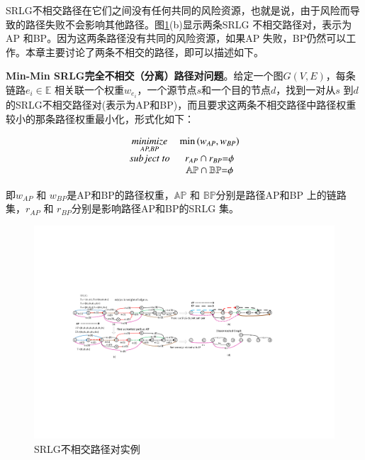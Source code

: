 SRLG不相交路径在它们之间没有任何共同的风险资源，也就是说，由于风险而导致的路径失败不会影响其他路径。图\ref{fig:CompositeGraph}(b)显示两条SRLG 不相交路径对，表示为AP 和BP。因为这两条路径没有共同的风险资源，如果AP 失败，BP仍然可以工作。本章主要讨论了两条不相交的路径，即可以描述如下。

\textbf{Min-Min SRLG完全不相交（分离）路径对问题}。给定一个图$G(V,E)$，每条链路$e_i\in \mathbb{E}$ 相关联一个权重$w_{e_i}$，一个源节点$s$和一个目的节点$d$，找到一对从$s$ 到$d$ 的SRLG不相交路径对(表示为AP和BP)，而且要求这两条不相交路径中路径权重较小的那条路径权重最小化，形式化如下：

\begin{equation}
\begin{array}{*{20}{c}}
   {\mathop {minimize}\limits_{AP,BP} } & {\min \left( {{w_{AP}},{w_{BP}}} \right)}  \\
   {subject\ to} & {{r_{AP}} \cap {r_{BP}}{\rm{ = }}\phi }  \\
   {} & {\mathbb{AP} \cap \mathbb{BP}{\rm{ = }}\phi }  \\
\end{array}
\label{eq:problem definition}
\end{equation}

即${w_{AP}}$ 和 ${w_{BP}}$是AP和BP的路径权重，$\mathbb{AP}$ 和 $\mathbb{BP}$分别是路径AP和BP 上的链路集，${r_{AP}}$ 和 ${r_{BP}}$分别是影响路径AP和BP的SRLG 集。

\begin{figure}[htbp]
  \centering
  \includegraphics[width=7.2in]{figures/CompositeGraph}
  \caption{SRLG不相交路径对实例}
  \label{fig:CompositeGraph}
\end{figure}

